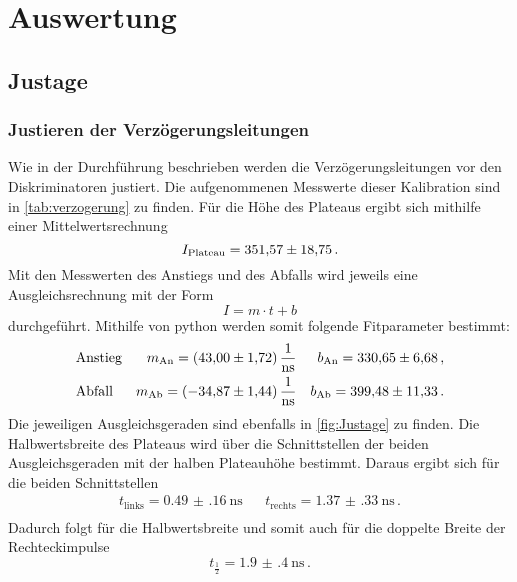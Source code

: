 \section{Auswertung}
\label{sec:Auswertung}

\subsection{Justage}
  \subsubsection{Justieren der Verzögerungsleitungen}
    Wie in der Durchführung beschrieben werden die Verzögerungsleitungen vor den Diskriminatoren justiert. 
    Die aufgenommenen Messwerte dieser Kalibration sind in \autoref{tab:verzogerung} zu finden.
    Für die Höhe des Plateaus ergibt sich mithilfe einer Mittelwertsrechnung
    \begin{equation*}
      I_\text{Plateau} = \num{351.57 \pm 18.75} \, .
    \end{equation*}
    Mit den Messwerten des Anstiegs und des Abfalls wird jeweils eine Ausgleichsrechnung mit der Form
    \begin{equation*}
      I = m \cdot t + b
    \end{equation*}
    durchgeführt.
    Mithilfe von python werden somit folgende Fitparameter bestimmt:
    \begin{align*}
      &\text{Anstieg} &m_\text{An}=\SI{43.00 \pm 1.72}{\per\nano\second}   &&b_\text{An}= \num{330.65 \pm 6.68} \, ,\\
      &\text{Abfall}  &m_\text{Ab}= \SI{-34.87 \pm 1.44}{\per\nano\second}  &&b_\text{Ab}= \num{399.48 \pm 11.33} \, .\\
    \end{align*}
    Die jeweiligen Ausgleichsgeraden sind ebenfalls in \autoref{fig:Justage} zu finden.
    Die Halbwertsbreite des Plateaus wird über die Schnittstellen der beiden Ausgleichsgeraden mit der halben Plateauhöhe bestimmt.
    Daraus ergibt sich für die beiden Schnittstellen
    \begin{align*}
      t_\text{links} = \SI{0.49(16)}{\nano\second} && t_\text{rechts}= \SI{1.37(33)}{\nano\second} \, . \\
    \end{align*}
    Dadurch folgt für die Halbwertsbreite und somit auch für die doppelte Breite der Rechteckimpulse
    \begin{equation*}
      t_\frac{1}{2} = \SI{1.9(4)}{\nano\second} \, .
    \end{equation*}
